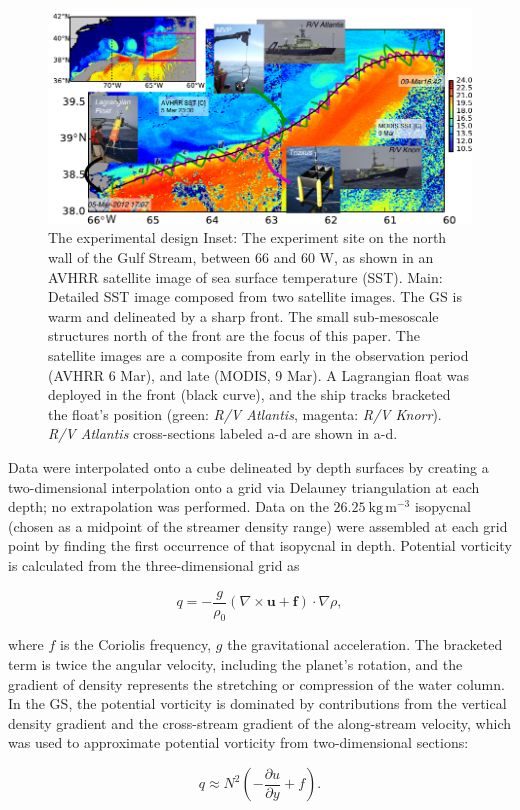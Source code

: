 \documentclass[draft,grl]{agutex2015}
\begin{document}
\begin{article}
\begin{figure}[htbp]
  \centering
    \includegraphics[width=\textwidth]{./SatOverviewSecDTry2.pdf}
   \caption{ The experimental design  Inset: The experiment site on the north wall of the Gulf Stream, between 66 and 60 W, as shown in an AVHRR satellite image of sea surface temperature (SST).  Main:  Detailed SST image composed from two satellite images.    The GS is warm and delineated by a sharp front.  The small sub-mesoscale structures north of the front are the focus of this paper.  The satellite images are a composite from early in the observation period (AVHRR 6 Mar), and late (MODIS, 9 Mar).  A Lagrangian float was deployed in the front (black curve), and the ship tracks bracketed the float's position (green: \emph{R/V Atlantis}, magenta: \emph{R/V Knorr}). \emph{R/V Atlantis} cross-sections labeled a-d are shown in a-d.  }\label{fig:SatOverviewSectD}
\end{figure}

Data were interpolated onto a cube delineated by depth surfaces by creating a two-dimensional interpolation onto a grid via Delauney triangulation at each depth; no extrapolation was performed.  Data on the $26.25\ \mathrm{kg\,m^{-3}}$ isopycnal (chosen as a midpoint of the streamer density range)  were assembled at each grid point by finding the first occurrence of that isopycnal in depth.  Potential vorticity is calculated from the three-dimensional grid as
\begin{linenomath} 
\begin{equation}
  q = -\frac{g}{\rho_0}\left(\nabla \times\mathbf{u}+\mathbf{f}\right) \cdot \nabla\rho,
\end{equation}
\end{linenomath}
where $f$ is the Coriolis frequency, $g$ the gravitational acceleration. The bracketed term is twice the angular velocity, including the planet's rotation, and the gradient of density represents the stretching or compression of the water column.  In the GS, the potential vorticity is dominated by contributions from the vertical density gradient and the cross-stream gradient of the along-stream velocity, which was used to approximate potential vorticity from two-dimensional sections:
\begin{linenomath} 
\begin{equation}
  q \approx N^2\left(-\frac{\partial u}{\partial y}+f\right).
\end{equation}
\end{linenomath}


\end{article}
\end{document}
